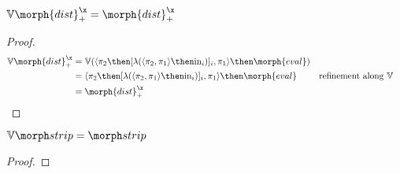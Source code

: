 \documentclass{rntz}\usepackage{fantasy}%
\begin{document}

\begin{lemma}\label{lem:vals-distx+}
  \(\vals{\morph{dist}^\x_+} = \morph{dist}^\x_+\)
\end{lemma}
\begin{proof}
  \begin{align*}
    \vals{\morph{dist}^\x_+} &=
    \vals{(\fork{\pi_2 \then \krof{\lambda (\fork{\pi_2,\pi_1} \then \injc_i)}_i, \pi_1}
    \then \morph{eval})}\\
    &= \fork{\pi_2 \then \krof{\lambda (\fork{\pi_2,\pi_1} \then \injc_i)}_i, \pi_1}
    \then \morph{eval}
    && \text{refinement along \valfn}\\
    &= \morph{dist}^\x_+
  \end{align*}
\end{proof}

\begin{lemma}\label{lem:vals-strip}
  \(\vals{\strip} = \strip\)
\end{lemma}
\begin{proof}
  \XXX
\end{proof}
\end{document}
